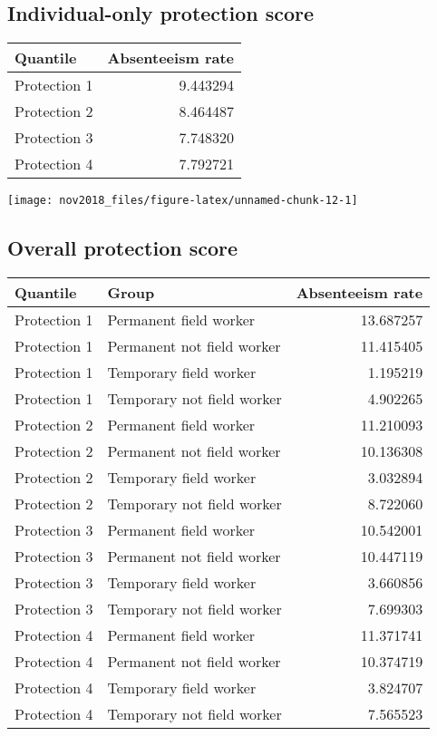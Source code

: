 \documentclass[]{article}
\begin{document}
\newpage

\subsection{Individual-only protection
score}\label{individual-only-protection-score}

\begin{tabular}{l|r}
\hline
Quantile & Absenteeism rate\\
\hline
Protection 1 & 9.443294\\
\hline
Protection 2 & 8.464487\\
\hline
Protection 3 & 7.748320\\
\hline
Protection 4 & 7.792721\\
\hline
\end{tabular}

\begin{center}\texttt{[image: nov2018\_files/figure-latex/unnamed-chunk-12-1]} \end{center}

\newpage

\subsection{Overall protection score}\label{overall-protection-score}

\begin{tabular}{l|l|r}
\hline
Quantile & Group & Absenteeism rate\\
\hline
Protection 1 & Permanent field worker & 13.687257\\
\hline
Protection 1 & Permanent not field worker & 11.415405\\
\hline
Protection 1 & Temporary field worker & 1.195219\\
\hline
Protection 1 & Temporary not field worker & 4.902265\\
\hline
Protection 2 & Permanent field worker & 11.210093\\
\hline
Protection 2 & Permanent not field worker & 10.136308\\
\hline
Protection 2 & Temporary field worker & 3.032894\\
\hline
Protection 2 & Temporary not field worker & 8.722060\\
\hline
Protection 3 & Permanent field worker & 10.542001\\
\hline
Protection 3 & Permanent not field worker & 10.447119\\
\hline
Protection 3 & Temporary field worker & 3.660856\\
\hline
Protection 3 & Temporary not field worker & 7.699303\\
\hline
Protection 4 & Permanent field worker & 11.371741\\
\hline
Protection 4 & Permanent not field worker & 10.374719\\
\hline
Protection 4 & Temporary field worker & 3.824707\\
\hline
Protection 4 & Temporary not field worker & 7.565523\\
\hline
\end{tabular}
\end{document}
